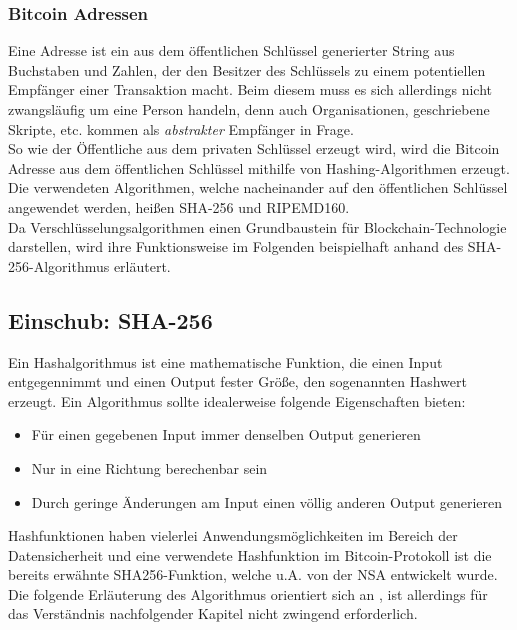 \subsubsection{Bitcoin Adressen}
Eine Adresse ist ein aus dem öffentlichen Schlüssel generierter String aus Buchstaben und Zahlen, der den Besitzer des Schlüssels zu einem potentiellen Empfänger einer Transaktion macht. Beim diesem muss es sich allerdings nicht zwangsläufig um eine Person handeln, denn auch Organisationen, geschriebene Skripte, etc. kommen als \emph{abstrakter} Empfänger in Frage.\\
So wie der Öffentliche aus dem privaten Schlüssel erzeugt wird, wird die Bitcoin Adresse aus dem öffentlichen Schlüssel mithilfe von Hashing-Algorithmen erzeugt. 
Die verwendeten Algorithmen, welche nacheinander auf den öffentlichen Schlüssel angewendet werden, heißen SHA-256 und RIPEMD160.\\
Da Verschlüsselungsalgorithmen einen Grundbaustein für Blockchain-Technologie darstellen, wird ihre Funktionsweise im Folgenden beispielhaft anhand des SHA-256-Algorithmus erläutert. 

\subsection{Einschub: SHA-256}
Ein Hashalgorithmus ist eine mathematische Funktion, die einen Input entgegennimmt und einen Output fester Größe, den sogenannten Hashwert erzeugt. Ein Algorithmus sollte idealerweise folgende Eigenschaften bieten:
\begin{itemize}
	\item Für einen gegebenen Input immer denselben Output generieren
	\item Nur in eine Richtung berechenbar sein
	\item Durch geringe Änderungen am Input einen völlig anderen Output generieren
\end{itemize}

Hashfunktionen haben vielerlei Anwendungsmöglichkeiten im Bereich der Datensicherheit und eine verwendete Hashfunktion im Bitcoin-Protokoll ist die bereits erwähnte SHA256-Funktion, welche u.A. von der NSA entwickelt wurde. Die folgende Erläuterung des Algorithmus orientiert sich an \cite{dang_2015}, ist allerdings für das Verständnis nachfolgender Kapitel nicht zwingend erforderlich.\\

